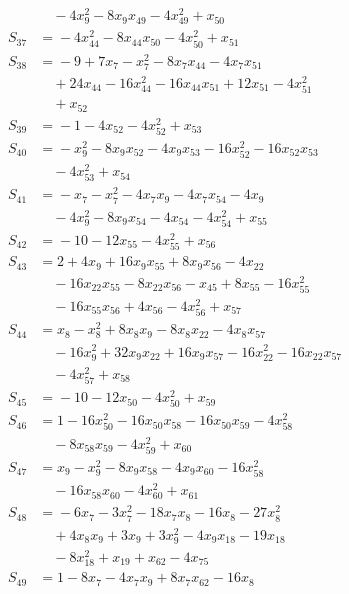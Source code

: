 \begin{align*}
&\quad{} -4x_{9}^{2} -8x_{9}x_{49} -4x_{49}^{2} +x_{50} \\
S_{37} &={} -4x_{44}^{2} -8x_{44}x_{50} -4x_{50}^{2} +x_{51} \\
S_{38} &={} -9 +7x_{7} -x_{7}^{2} -8x_{7}x_{44} -4x_{7}x_{51} \\
&\quad{} +24x_{44} -16x_{44}^{2} -16x_{44}x_{51} +12x_{51} -4x_{51}^{2} \\
&\quad{} +x_{52} \\
S_{39} &={} -1 -4x_{52} -4x_{52}^{2} +x_{53} \\
S_{40} &={} -x_{9}^{2} -8x_{9}x_{52} -4x_{9}x_{53} -16x_{52}^{2} -16x_{52}x_{53} \\
&\quad{} -4x_{53}^{2} +x_{54} \\
S_{41} &={} -x_{7} -x_{7}^{2} -4x_{7}x_{9} -4x_{7}x_{54} -4x_{9} \\
&\quad{} -4x_{9}^{2} -8x_{9}x_{54} -4x_{54} -4x_{54}^{2} +x_{55} \\
S_{42} &={} -10 -12x_{55} -4x_{55}^{2} +x_{56} \\
S_{43} &={} 2 +4x_{9} +16x_{9}x_{55} +8x_{9}x_{56} -4x_{22} \\
&\quad{} -16x_{22}x_{55} -8x_{22}x_{56} -x_{45} +8x_{55} -16x_{55}^{2} \\
&\quad{} -16x_{55}x_{56} +4x_{56} -4x_{56}^{2} +x_{57} \\
S_{44} &={} x_{8} -x_{8}^{2} +8x_{8}x_{9} -8x_{8}x_{22} -4x_{8}x_{57} \\
&\quad{} -16x_{9}^{2} +32x_{9}x_{22} +16x_{9}x_{57} -16x_{22}^{2} -16x_{22}x_{57} \\
&\quad{} -4x_{57}^{2} +x_{58} \\
S_{45} &={} -10 -12x_{50} -4x_{50}^{2} +x_{59} \\
S_{46} &={} 1 -16x_{50}^{2} -16x_{50}x_{58} -16x_{50}x_{59} -4x_{58}^{2} \\
&\quad{} -8x_{58}x_{59} -4x_{59}^{2} +x_{60} \\
S_{47} &={} x_{9} -x_{9}^{2} -8x_{9}x_{58} -4x_{9}x_{60} -16x_{58}^{2} \\
&\quad{} -16x_{58}x_{60} -4x_{60}^{2} +x_{61} \\
S_{48} &={} -6x_{7} -3x_{7}^{2} -18x_{7}x_{8} -16x_{8} -27x_{8}^{2} \\
&\quad{} +4x_{8}x_{9} +3x_{9} +3x_{9}^{2} -4x_{9}x_{18} -19x_{18} \\
&\quad{} -8x_{18}^{2} +x_{19} +x_{62} -4x_{75} \\
S_{49} &={} 1 -8x_{7} -4x_{7}x_{9} +8x_{7}x_{62} -16x_{8} \\

\end{align*}
